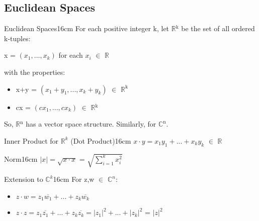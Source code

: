 	\newpage





\subsection{ Euclidean Spaces }

	\begin{definition}{Euclidean Spaces}{16cm}
		For each positive integer k, let $\mathbb{R}$$^\text{k}$ be the set of all ordered k-tuples:

		\hspace{0.5cm}
		x = $(x_1,...,x_k)$
		\hspace{1cm}
		for each $x_i$ $\in$ $\mathbb{R}$

		with the properties:
		\begin{itemize}[leftmargin=1cm, itemsep=0.1cm]
			\item x+y = $(x_1+y_1,...,x_k+y_k)$ $\in$ $\mathbb{R}^{\text{k}}$
		
			\item cx = $(cx_1,...,cx_k)$ $\in$ $\mathbb{R}$$^\text{k}$
		\end{itemize}

		So, $\mathbb{R}$$^\text{n}$ has a vector space structure.
		Similarly, for $\mathbb{C}^{\text{n}}$.
	\end{definition}

	\vspace{0.5cm}



	\begin{definition}{Inner Product for $\mathbb{R}^k$ (Dot Product)}{16cm}
		$x \cdot y = x_1y_1 + ... + x_ky_k$ $\in$ $\mathbb{R}$
	\end{definition}

	\vspace{0.5cm}



	\begin{definition}{Norm}{16cm}
		$|x| = \sqrt{x \cdot x}$ = $\sqrt{\sum_{i=1}^k x_i^2}$
	\end{definition}

	\vspace{0.5cm}



	\begin{definition}{Extension to $\mathbb{C}^k$}{16cm}
		For z,w $\in$ $\mathbb{C}^n$:
		
		\begin{itemize}[leftmargin=1cm, itemsep=0.1cm]
			\item $z \cdot w = z_1\overline{w_1} + ... + z_k\overline{w_k}$
		
			\item $z \cdot z = z_1\overline{z_1} + ... + z_k\overline{z_k}
				= |z_1|^2 + ... + |z_k|^2$ = $|z|^2$
		\end{itemize}
	\end{definition}

